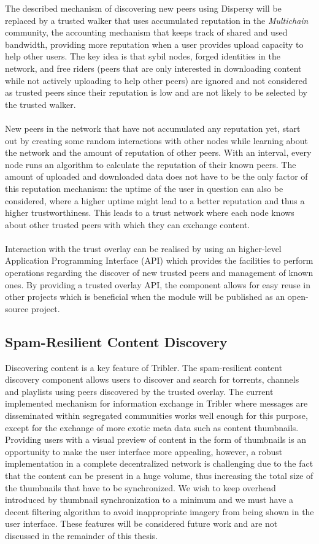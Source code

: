 \noindent The described mechanism of discovering new peers using Dispersy will be replaced by a trusted walker that uses accumulated reputation in the \emph{Multichain} community, the accounting mechanism that keeps track of shared and used bandwidth, providing more reputation when a user provides upload capacity to help other users. The key idea is that sybil nodes, forged identities in the network, and free riders (peers that are only interested in downloading content while not actively uploading to help other peers) are ignored and not considered as trusted peers since their reputation is low and are not likely to be selected by the trusted walker.\\\\
New peers in the network that have not accumulated any reputation yet, start out by creating some random interactions with other nodes while learning about the network and the amount of reputation of other peers. With an interval, every node runs an algorithm to calculate the reputation of their known peers. The amount of uploaded and downloaded data does not have to be the only factor of this reputation mechanism: the uptime of the user in question can also be considered, where a higher uptime might lead to a better reputation and thus a higher trustworthiness. This leads to a trust network where each node knows about other trusted peers with which they can exchange content.\\\\
Interaction with the trust overlay can be realised by using an higher-level Application Programming Interface (API) which provides the facilities to perform operations regarding the discover of new trusted peers and management of known ones. By providing a trusted overlay API, the component allows for easy reuse in other projects which is beneficial when the module will be published as an open-source project.

\subsection{Spam-Resilient Content Discovery}
Discovering content is a key feature of Tribler. The spam-resilient content discovery component allows users to discover and search for torrents, channels and playlists using peers discovered by the trusted overlay. The current implemented mechanism for information exchange in Tribler where messages are disseminated within segregated communities works well enough for this purpose, except for the exchange of more exotic  meta data such as content thumbnails. Providing users with a visual preview of content in the form of thumbnails is an opportunity to make the user interface more appealing, however, a robust implementation in a complete decentralized network is challenging due to the fact that the content can be present in a huge volume, thus increasing the total size of the thumbnails that have to be synchronized. We wish to keep overhead introduced by thumbnail synchronization to a minimum and we must have a decent filtering algorithm to avoid inappropriate imagery from being shown in the user interface. These features will be considered future work and are not discussed in the remainder of this thesis.


